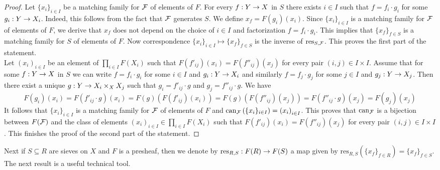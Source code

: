 \begin{proof}
Let $\{x_i\}_{i\in I}$ be a matching family for ${\mathcal F}$ of elements of $F$. For every $f:Y\rightarrow X$ in $S$ there exists $i\in I$ such that $f = f_i\cdot g_i$ for some $g_i:Y\rightarrow X_i$. Indeed, this follows from the fact that ${\mathcal F}$ generates $S$. We define $x_f = F(g_i)(x_i)$. Since $\{x_i\}_{i\in I}$ is a matching family for ${\mathcal F}$ of elements of $F$, we derive that $x_f$ does not depend on the choice of $i\in I$ and factorization $f = f_i\cdot g_i$. This implies that $\{x_f\}_{f\in S}$ is a matching family for $S$ of elements of $F$. Now correspondence $\{x_i\}_{i\in I}\mapsto \{x_f\}_{f\in S}$ is the inverse of $\mathrm{res}_{S,{\mathcal F}}$. This proves the first part of the statement.\\
Let $\left(x_i\right)_{i\in I}$ be an element of $\prod_{i\in I}F(X_i)$ such that $F(f'_{ij})(x_i)=F(f''_{ij})(x_j)$ for every pair $(i,j)\in I\times I$. Assume that for some $f:Y\rightarrow X$ in $S$ we can write $f = f_i\cdot g_i$ for some $i\in I$ and $g_i:Y\rightarrow X_i$ and similarly $f = f_j\cdot g_j$ for some $j\in I$ and $g_j:Y\rightarrow X_j$. Then there exist a unique $g:Y\rightarrow X_i\times_XX_j$ such that $g_i = f'_{ij}\cdot g$ and $g_j = f''_{ij}\cdot g$. We have
$$F(g_i)(x_i)=F(f'_{ij}\cdot g)(x_i)=F(g)\left(F(f'_{ij})(x_i)\right)=F(g)\left(F(f''_{ij})(x_j)\right)=F(f''_{ij}\cdot g)(x_j)=F(g_j)(x_j)$$
It follows that $\{x_i\}_{i\in I}$ is a matching family for ${\mathcal F}$ of elements of $F$ and $\mathrm{can}_{{\mathcal F}}\left(\{x_i\}_{i\in I}\right)=\left(x_i\right)_{i\in I}$. This proves that $\mathrm{can}_{{\mathcal F}}$ is a bijection between $F({\mathcal F})$ and the class of elements $\left(x_i\right)_{i\in I}\in \prod_{i\in I}F(X_i)$ such that $F(f'_{ij})(x_i)=F(f''_{ij})(x_j)$ for every pair $(i,j)\in I\times I$. This finishes the proof of the second part of the statement.
\end{proof}
\noindent
Next if $S\subseteq R$ are sieves on $X$ and $F$ is a presheaf, then we denote by $\mathrm{res}_{R,S}:F(R)\rightarrow F(S)$ a map given by $\mathrm{res}_{R,S}(\{x_f\}_{f\in R}) = \{x_f\}_{f\in S}$. The next result is a useful technical tool.\\

